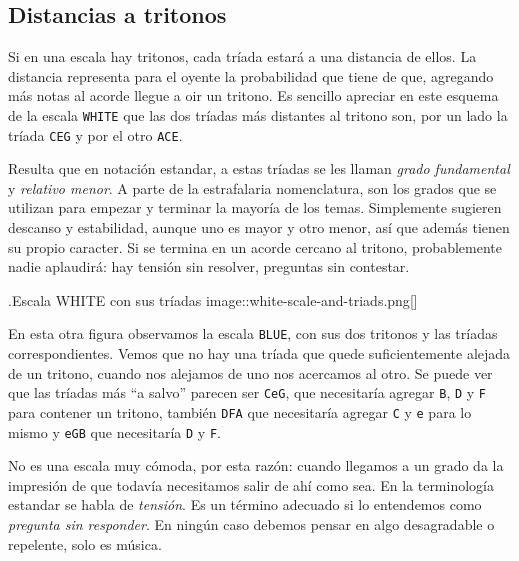 \documentclass[]{article}
\begin{document}
\subsection{Distancias a tritonos}

Si en una escala hay tritonos, cada tríada estará a una distancia de ellos. La distancia representa para el oyente la probabilidad que tiene de que, agregando más notas al acorde llegue a oir un tritono. Es sencillo apreciar en este esquema de la escala \texttt{WHITE} que las dos tríadas más distantes al tritono son, por un lado la tríada \texttt{CEG} y por el otro \texttt{ACE}.

Resulta que en notación estandar, a estas tríadas se les llaman \emph{grado fundamental} y \emph{relativo menor}. A parte de la estrafalaria nomenclatura, son los grados que se utilizan para empezar y terminar la mayoría de los temas. Simplemente sugieren descanso y estabilidad, aunque uno es mayor y otro menor, así que además tienen su propio caracter. Si se termina en un acorde cercano al tritono, probablemente nadie aplaudirá: hay tensión sin resolver, preguntas sin contestar.

.Escala WHITE con sus tríadas image::white-scale-and-triads.png{[}{]}

En esta otra figura observamos la escala \texttt{BLUE}, con sus dos tritonos y las tríadas correspondientes. Vemos que no hay una tríada que quede suficientemente alejada de un tritono, cuando nos alejamos de uno nos acercamos al otro. Se puede ver que las tríadas más ``a salvo'' parecen ser \texttt{CeG}, que necesitaría agregar \texttt{B}, \texttt{D} y \texttt{F} para contener un tritono, también \texttt{DFA} que necesitaría agregar \texttt{C} y \texttt{e} para lo mismo y \texttt{eGB} que necesitaría \texttt{D} y \texttt{F}.

No es una escala muy cómoda, por esta razón: cuando llegamos a un grado da la impresión de que todavía necesitamos salir de ahí como sea. En la terminología estandar se habla de \emph{tensión}. Es un término adecuado si lo entendemos como \emph{pregunta sin responder}. En ningún caso debemos pensar en algo desagradable o repelente, solo es música.
\end{document}
